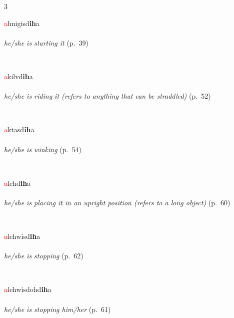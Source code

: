 \documentclass[oneside,openany]{book}%
\begin{document}
\begin{multicols}{3}
\begin{minipage}[t]{\linewidth}
\raggedright\noindent \textcolor{Red}{a}hnigisd\textbf{ih}a\\
\\
\noindent \textit{he/she is starting it} (p.~39)
\end{minipage}\\[1em]%
\begin{minipage}[t]{\linewidth}
\raggedright\noindent \textcolor{Red}{a}kilvd\textbf{ih}a\\
\\
\noindent \textit{he/she is riding it (refers to anything that can be straddled)} (p.~52)
\end{minipage}\\[1em]%
\begin{minipage}[t]{\linewidth}
\raggedright\noindent \textcolor{Red}{a}ktasd\textbf{ih}a\\
\\
\noindent \textit{he/she is winking} (p.~54)
\end{minipage}\\[1em]%
\begin{minipage}[t]{\linewidth}
\raggedright\noindent \textcolor{Red}{a}lehd\textbf{ih}a\\
\\
\noindent \textit{he/she is placing it in an upright position (refers to a long object)} (p.~60)
\end{minipage}\\[1em]%
\begin{minipage}[t]{\linewidth}
\raggedright\noindent \textcolor{Red}{a}lehwisd\textbf{ih}a\\
\\
\noindent \textit{he/she is stopping} (p.~62)
\end{minipage}\\[1em]%
\begin{minipage}[t]{\linewidth}
\raggedright\noindent \textcolor{Red}{a}lehwisdohd\textbf{ih}a\\
\\
\noindent \textit{he/she is stopping him/her} (p.~61)

\end{minipage}
\end{multicols}
\end{document}
